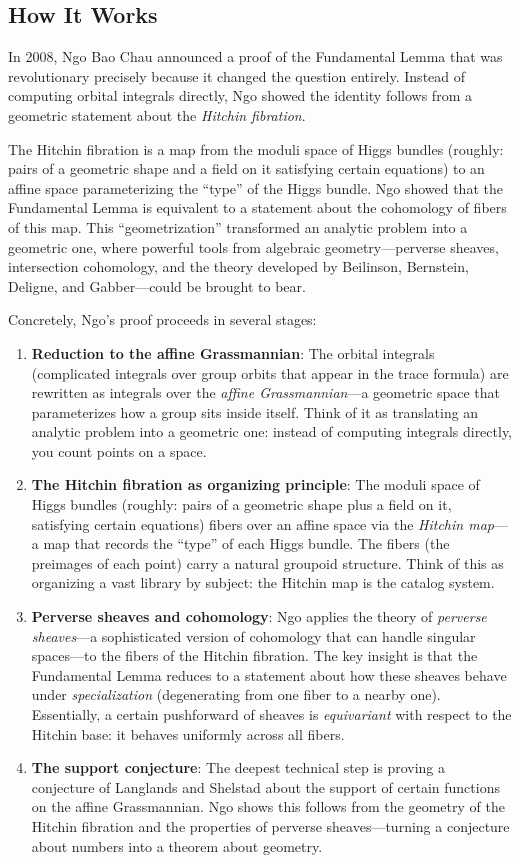 \subsection{How It Works}

In 2008, Ngo Bao Chau announced a proof of the Fundamental Lemma that was revolutionary precisely because it changed the question entirely. Instead of computing orbital integrals directly, Ngo showed the identity follows from a geometric statement about the \emph{Hitchin fibration}.

The Hitchin fibration is a map from the moduli space of Higgs bundles (roughly: pairs of a geometric shape and a field on it satisfying certain equations) to an affine space parameterizing the ``type'' of the Higgs bundle. Ngo showed that the Fundamental Lemma is equivalent to a statement about the cohomology of fibers of this map. This ``geometrization'' transformed an analytic problem into a geometric one, where powerful tools from algebraic geometry---perverse sheaves, intersection cohomology, and the theory developed by Beilinson, Bernstein, Deligne, and Gabber---could be brought to bear.

Concretely, Ngo's proof proceeds in several stages:

\begin{enumerate}
\item \textbf{Reduction to the affine Grassmannian}: The orbital integrals (complicated integrals over group orbits that appear in the trace formula) are rewritten as integrals over the \emph{affine Grassmannian}---a geometric space that parameterizes how a group sits inside itself. Think of it as translating an analytic problem into a geometric one: instead of computing integrals directly, you count points on a space.
\item \textbf{The Hitchin fibration as organizing principle}: The moduli space of Higgs bundles (roughly: pairs of a geometric shape plus a field on it, satisfying certain equations) fibers over an affine space via the \emph{Hitchin map}---a map that records the ``type'' of each Higgs bundle. The fibers (the preimages of each point) carry a natural groupoid structure. Think of this as organizing a vast library by subject: the Hitchin map is the catalog system.
\item \textbf{Perverse sheaves and cohomology}: Ngo applies the theory of \emph{perverse sheaves}---a sophisticated version of cohomology that can handle singular spaces---to the fibers of the Hitchin fibration. The key insight is that the Fundamental Lemma reduces to a statement about how these sheaves behave under \emph{specialization} (degenerating from one fiber to a nearby one). Essentially, a certain pushforward of sheaves is \emph{equivariant} with respect to the Hitchin base: it behaves uniformly across all fibers.
\item \textbf{The support conjecture}: The deepest technical step is proving a conjecture of Langlands and Shelstad about the support of certain functions on the affine Grassmannian. Ngo shows this follows from the geometry of the Hitchin fibration and the properties of perverse sheaves---turning a conjecture about numbers into a theorem about geometry.
\end{enumerate}

